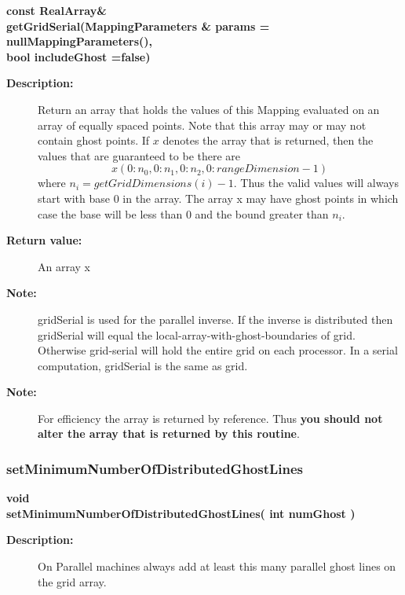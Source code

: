 \begin{flushleft} \textbf{%
const RealArray\&  \\ 
\settowidth{\MappingIncludeArgIndent}{getGridSerial(}%
getGridSerial(MappingParameters \& params  = nullMappingParameters(),\\ 
\hspace{\MappingIncludeArgIndent}bool includeGhost  =false)
}\end{flushleft}
\begin{description}
\item[{\bf Description:}] 
   Return an array that holds the values of this Mapping evaluated on
  an array of equally spaced points. Note that this array may or may not
  contain ghost points. If $x$ denotes the array that is returned, then
  the values that are guaranteed to be there are
    \[
         x(0:n_0,0:n_1,0:n_2,0:rangeDimension-1) 
    \]
   where $n_i = getGridDimensions(i)-1$. Thus the valid values will always start
   with base 0 in the array. The array x may have ghost points in which case the
   base will be less than $0$ and the bound greater than $n_i$.
\item[{\bf Return value:}]  An array x 
\item[{\bf Note:}]  gridSerial is used for the parallel inverse. If the inverse is distributed then
   gridSerial will equal the local-array-with-ghost-boundaries of grid. Otherwise grid-serial
   will hold the entire grid on each processor. In a serial computation, gridSerial is the same as grid.
\item[{\bf Note:}]  For efficiency the array is returned by reference. Thus {\bf you should not
    alter the array that is returned by this routine}.
\end{description}
\subsubsection{setMinimumNumberOfDistributedGhostLines}
 
\begin{flushleft} \textbf{%
void  \\ 
\settowidth{\MappingIncludeArgIndent}{setMinimumNumberOfDistributedGhostLines(}%
setMinimumNumberOfDistributedGhostLines( int numGhost )
}\end{flushleft}
\begin{description}
\item[{\bf Description:}] 
 On Parallel machines always add at least this many parallel ghost lines on the grid array.
\end{description}
